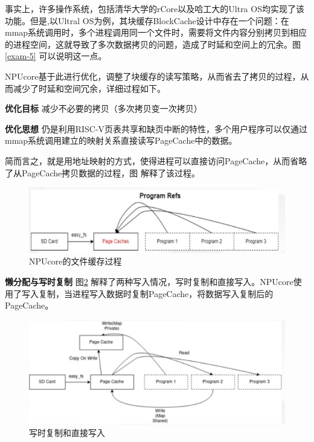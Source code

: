 事实上，许多操作系统，包括清华大学的rCore以及哈工大的Ultra OS均实现了该功能。但是,以Ultral OS为例，其块缓存BlockCache设计中存在一个问题：在mmap系统调用时，多个进程调用同一个文件时，需要将文件内容分别拷贝到相应的进程空间，这就导致了多次数据拷贝的问题，造成了时延和空间上的冗余。图\ref{exam-5} 可以说明这一点。

NPUcore基于此进行优化，调整了块缓存的读写策略，从而省去了拷贝的过程，从而减少了时延和空间冗余，详细过程如下。

\textbf{优化目标} \; 减少不必要的拷贝（多次拷贝变一次拷贝）

\textbf{优化思想} \; 仍是利用RISC-V页表共享和缺页中断的特性，多个用户程序可以仅通过mmap系统调用建立的映射关系直接读写PageCache中的数据。

简而言之，就是用地址映射的方式，使得进程可以直接访问PageCache，从而省略了从PageCache拷贝数据的过程，图 解释了该过程。

\begin{figure}[htbp]
	\centering
	\includegraphics[scale=0.6]{figures/10-04/10-04-NPUcore的文件缓存过程.png}
	\caption{NPUcore的文件缓存过程}
	\label{exam-6}
\end{figure}

\textbf{懒分配与写时复制}\; 图\ref{exam-7} 解释了两种写入情况，写时复制和直接写入。NPUcore使用了写入复制，当进程写入数据时复制PageCache，将数据写入复制后的PageCache。

\begin{figure}[htbp]
	\centering
	\includegraphics[scale=0.6]{figures/10-04/10-04-写时复制和直接写入.png}
	\caption{写时复制和直接写入}
	\label{exam-7}
\end{figure}

